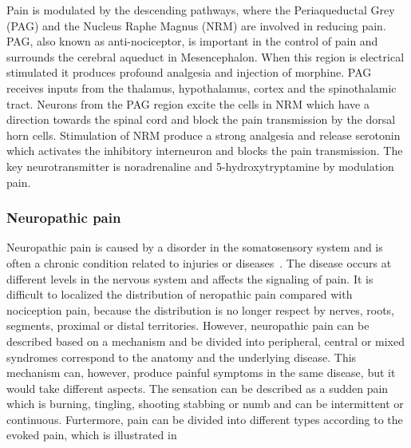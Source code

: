 Pain is modulated by the descending pathways, where the Periaqueductal Grey (PAG) and the Nucleus Raphe Magnus (NRM) are involved in reducing pain. PAG, also known as anti-nociceptor, is important in the control of pain and surrounds the cerebral aqueduct in Mesencephalon. When this region is electrical stimulated it produces profound analgesia and injection of morphine. PAG receives inputs from the thalamus, hypothalamus, cortex and the spinothalamic tract. Neurons from the PAG region excite the cells in NRM which have a direction towards the spinal cord and block the pain transmission by the dorsal horn cells. Stimulation of NRM produce a strong analgesia and release serotonin which activates the inhibitory interneuron and blocks the pain transmission. The key neurotransmitter is noradrenaline and 5-hydroxytryptamine by modulation pain.~\cite{Steeds2013}

\subsubsection{Neuropathic pain}
Neuropathic pain is caused by a disorder in the somatosensory system and is often a chronic condition related to injuries or diseases~\cite{Mindruta2013}. The disease occurs at different levels in the nervous system and affects the signaling of pain. It is difficult to localized the distribution of neropathic pain compared with nociception pain, because the distribution is no longer respect by nerves, roots, segments, proximal or distal territories. However, neuropathic pain can be described based on a mechanism and be divided into peripheral, central or mixed syndromes correspond to the anatomy and the underlying disease. This mechanism can, however, produce painful symptoms in the same disease, but it would take different aspects. The sensation can be described as a sudden pain which is burning, tingling, shooting stabbing or numb and can be intermittent or continuous. Furtermore, pain can be divided into different types according to the evoked pain, which is illustrated in 

